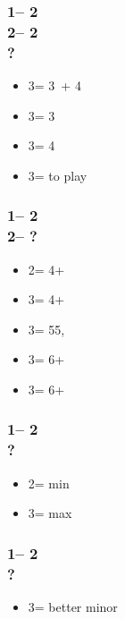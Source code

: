 \documentclass[12pt, a4paper]{report}
\begin{document}
{{        \subsubsection*{1\nt -- 2\diams\\
                        2\hearts -- 2\nt\\
                        ?}
        \begin{itemize}
            \item 3\clubs = 3\hearts\ + 4\clubs
            \item 3\diams = 3\hearts
            \item 3\hearts = 4\clubs
            \item 3\nt = to play
        \end{itemize}

        \subsubsection*{1\nt -- 2\hearts\\
                        2\spades -- ?}
        \begin{itemize}
            \item 2\nt = 4+\clubs\ \gf
            \item 3\clubs = 4+\diams\ \gf
            \item 3\diams = 55\major, \inv
            \item 3\hearts = 6+\spades\ \gf
            \item 3\spades = 6+\spades\ \inv
        \end{itemize}

        \subsubsection*{1\nt -- 2\spades\\
                        ?}
        \begin{itemize}
            \item 2\nt = min
            \item 3\clubs = max
        \end{itemize}

        \subsubsection*{1\nt -- 2\nt\\
                        ?}
        \begin{itemize}
            \item 3\minor = better minor
        \end{itemize}

}}
\end{document}
